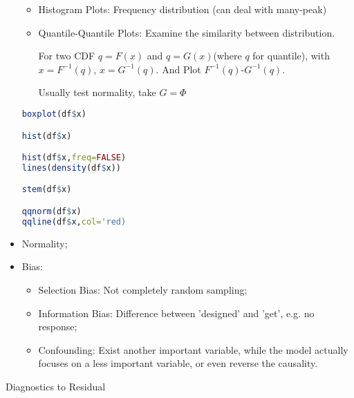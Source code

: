 \begin{itemize}[topsep=2pt,itemsep=2pt]
\begin{itemize}[topsep=2pt,itemsep=2pt]
    
            

            \item Histogram Plots: Frequency distribution (can deal with many-peak)
            \item Quantile-Quantile Plots: Examine the similarity  between distribution.
            
            For two CDF $ q=F(x) $ and $ q=G(x) $(where $ q $ for quantile), with $ x=F^{-1}(q) $, $ x=G^{-1}(q) $. And Plot $ F^{-1}(q) $-$ G^{-1}(q) $.

            Usually test normality, take $ G=\Phi  $
        \end{itemize}
\begin{rcode}
\begin{lstlisting}[language=R]
boxplot(df$x)

hist(df$x)

hist(df$x,freq=FALSE)
lines(density(df$x))

stem(df$x)

qqnorm(df$x)
qqline(df$x,col='red)
\end{lstlisting}

\end{rcode}
            
        \item Normality;
        \item Bias:
        \begin{itemize}[topsep=2pt,itemsep=2pt]
            \item Selection Bias: Not completely random sampling;
            \item Information Bias: Difference between 'designed' and 'get', e.g. no response;
            \item Confounding: Exist another important variable, while the model actually focuses on a less important variable, or even reverse the causality.
        \end{itemize}
        
            
    \end{itemize}
    
\begin{point}
    Diagnostics to Residual
\end{point}

   

